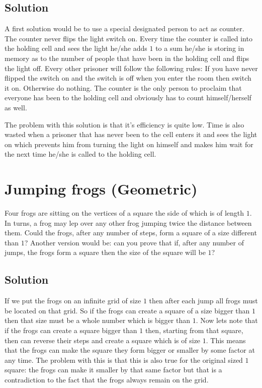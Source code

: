 \documentclass{article}
\begin{document}
\subsection{Solution}
A first solution would be to use a special designated person to act as counter. The counter never flips the light switch on. Every time the counter is called into the holding cell and sees the light he/she adds $1$ to a sum he/she is storing in memory as to the number of people that have been in the holding cell and flips the light off. Every other prisoner will follow the following rules: If you have never flipped the switch on and the switch is off when you enter the room then switch it on. Otherwise do nothing. The counter is the only person to proclaim that everyone has been to the holding cell and obviously has to count himself/herself as well.

The problem with this solution is that it's efficiency is quite low. Time is also wasted when a prisoner that has never been to the cell enters it and sees the light on which prevents him from turning the light on himself and makes him wait for the next time he/she is called to the holding cell.

\section{Jumping frogs (Geometric)}
Four frogs are sitting on the vertices of a square the side of which is of length $1$. In turns, a frog may lep over any other frog jumping twice the distance between them. Could the frogs, after any number of steps, form a square of a size different than $1$? Another version would be: can you prove that if, after any number of jumps, the frogs form a square then the size of the square will be $1$?

\subsection{Solution}
If we put the frogs on an infinite grid of size $1$ then after each jump all frogs must be located on that grid. So if the frogs can create a square of a size bigger than $1$ then that size must be a whole number which is bigger than $1$. Now lets note that if the frogs can create a square bigger than $1$ then, starting from that square, then can reverse their steps and create a square which is of size $1$. This means that the frogs can make the square they form bigger or smaller by some factor at any time. The problem with this is that this is also true for the original sized $1$ square: the frogs can make it smaller by that same factor but that is a contradiction to the fact that the frogs always remain on the grid.
\end{document}
